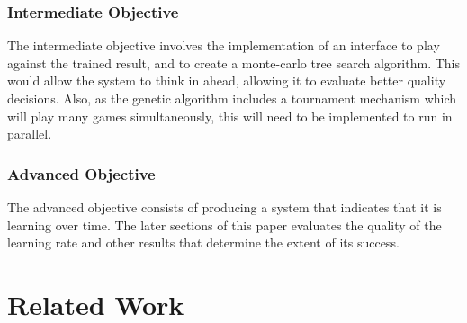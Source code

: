 \documentclass[12pt,a4paper]{article}
\begin{document}
    \subsubsection{Intermediate Objective}
        The intermediate objective involves the implementation of an interface to play against the trained result, and to create a monte-carlo tree search  algorithm. This would allow the system to think in ahead, allowing it to evaluate better quality decisions. Also, as the genetic algorithm includes a tournament mechanism which will play many games simultaneously, this will need to be implemented to run in parallel.
        
    \subsubsection{Advanced Objective}
        The advanced objective consists of producing a system that indicates that it is learning over time. The later sections of this paper evaluates the quality of the learning rate and other results that determine the extent of its success.
    
    

\section{Related Work}
\end{document}
